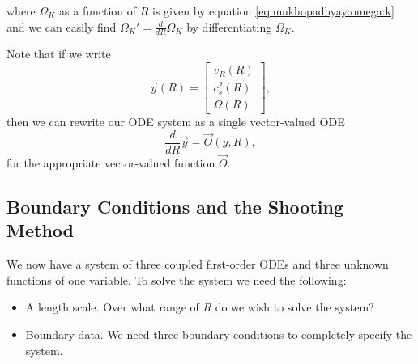 \documentclass[]{article}
\newcommand{\myvec}[1]{\vec{#1}} %
\newcommand{\ddR}{\frac{d}{dR}}
\newcommand{\threevector}[3]{\left[\begin{matrix} #1\\ #2\\ #3 \end{matrix}\right]}
\begin{document}
where $\Omega_K$ as a function of $R$ is given by equation
\eqref{eq:mukhopadhyay:omega:k} and we can easily find
$\Omega_K'=\ddR\Omega_K$ by differentiating $\Omega_K$.

Note that if we write
\begin{equation}
  \label{eq:y:definition}
  \myvec{y}(R) = \threevector{v_R(R)}{c_s^2(R)}{\Omega(R)},
\end{equation}
then we can rewrite our ODE system as a single vector-valued ODE
\begin{equation}
  \label{eq:y:prime:equation}
  \ddR\myvec{y} = \myvec{O}(y,R),
\end{equation}
for the appropriate vector-valued function $\myvec{O}$.

\subsection{Boundary Conditions and the Shooting Method}
\label{subsec:boundary:conditions}

We now have a system of three coupled first-order ODEs and three
unknown functions of one variable. To solve the system we need the
following:
\begin{itemize}
\item A length scale. Over what range of $R$ do we wish to solve the
  system?
\item Boundary data. We need three boundary conditions to completely
  specify the system.
\end{itemize}
\end{document}
